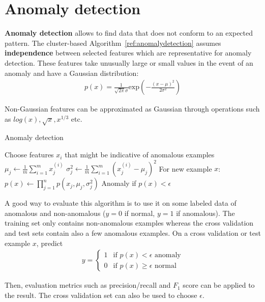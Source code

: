 \documentclass{report}
\begin{document}
\section{Anomaly detection}
{\bf Anomaly detection} allows to find data that does not conform to an expected pattern. The cluster-based Algorithm~\ref{ref:anomalydetection} assumes {\bf independence} between selected features which are representative for anomaly detection. These features take unusually large or small values in the event of an anomaly and have a Gaussian distribution:
\begin{align*}
p(x)=\frac{1}{\sqrt{2\pi}\sigma}\mbox{exp}(-\frac{(x-\mu)^2}{2\sigma^2})
\end{align*}

Non-Gaussian features can be approximated as Gaussian through operations such as $log(x), \sqrt{x}, x^{1/3}$ etc.

\begin{algorithm}
\caption{Anomaly detection}
\label{ref:anomalydetection}
\begin{algorithmic}
\State Choose features $x_i$ that might be indicative of anomalous examples
\State $\mu_j \gets \frac{1}{m}\sum_{i=1}^{m}x_j^{(i)}$ 
\State $\sigma_j^2 \gets \frac{1}{m}\sum_{i=1}^{m}(x_j^{(i)}-\mu_j)^2$
\State For new example $x$: $p(x) \gets \prod_{j=1}^np(x_j,\mu_j,\sigma_j^2)$ 
\State Anomaly if $p(x) < \epsilon$
\end{algorithmic}
\end{algorithm}

A good way to evaluate this algorithm is to use it on some labeled data of anomalous and non-anomalous ($y=0$ if normal, $y=1$ if anomalous). The training set only contains non-anomalous examples whereas the cross validation and test sets contain also a few anomalous examples. On a cross validation or test example $x$, predict
\begin{align*}
y = \left\{
\begin{array}{lll}
1  & \mbox{if } p(x) < \epsilon \mbox{ anomaly} \\
0  & \mbox{if } p(x) \ge \epsilon \mbox{ normal}
\end{array}
\right.
\end{align*}

Then, evaluation metrics such as precision/recall and $F_1$ score can be applied to the result. The cross validation set can also be used to choose $\epsilon$.
\end{document}
